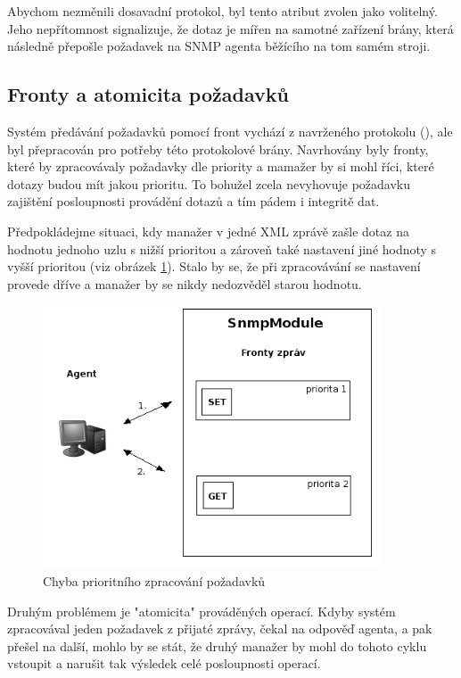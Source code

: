 Abychom nezměnili dosavadní protokol, byl tento atribut zvolen jako volitelný. Jeho nepřítomnost signalizuje, že dotaz je mířen
na samotné zařízení brány, která následně přepošle požadavek na SNMP agenta běžícího na tom samém stroji.


\subsection{Fronty a atomicita požadavků}
\label{kap_impl_fronta_atomicita}
Systém předávání požadavků pomocí front vychází z navrženého protokolu (\cite{macejko_dipl}), ale byl přepracován pro potřeby
této protokolové brány. Navrhovány byly fronty, které by zpracovávaly požadavky dle priority a mamažer by si mohl říci, které
dotazy budou mít jakou prioritu. To bohužel zcela nevyhovuje požadavku zajištění posloupnosti provádění dotazů a tím pádem i 
integritě dat.

Předpokládejme situaci, kdy manažer v jedné XML zprávě zašle dotaz na hodnotu jednoho uzlu s nižší prioritou a zároveň také nastavení
jiné hodnoty s vyšší prioritou (viz obrázek \ref{obr_impl_atom1}). Stalo by se, že při zpracovávání se nastavení provede dříve a manažer by se nikdy nedozvěděl starou hodnotu.
\begin{figure}[htp]
	\begin{center}
		\includegraphics[width=10cm]{obrazky/05_atom1.png}
		\caption{Chyba prioritního zpracování požadavků}
		\label{obr_impl_atom1}
	\end{center}
\end{figure}

Druhým problémem je "atomicita" prováděných operací. Kdyby systém zpracovával jeden požadavek z přijaté zprávy, čekal na odpověď agenta, a pak
přešel na další, mohlo by se stát, že druhý manažer by mohl do tohoto cyklu vstoupit a narušit tak výsledek celé posloupnosti operací.

